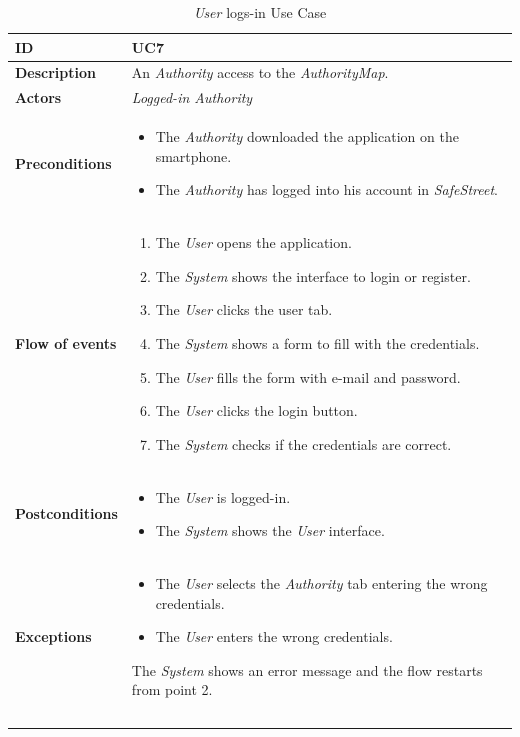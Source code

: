 \documentclass {article}
\begin{document}
	\begin{longtable}{| p{3 cm} | p{10.5 cm} |} 
			\hline
			{\bf ID} & UC7 \\
			\hline
			{\bf Description} & An {\it Authority} access to the {\it AuthorityMap}.\\
			\hline
			{\bf Actors} & {\it Logged-in Authority}\\
			\hline
			{\bf Preconditions} & 	
			\begin{itemize}
				\item The {\it Authority} downloaded the application on the smartphone.
				\item The {\it Authority} has logged into his account in {\it SafeStreet}.
			\end{itemize}
			\\
			\hline
			{\bf Flow of events} &	
			\begin{enumerate}
				\item The {\it User} opens the application.
				\item The {\it System} shows the interface to login or register.
				\item The {\it User} clicks the user tab.
				\item The {\it System} shows a form to fill with the credentials.
				\item The {\it User} fills the form with e-mail and password. 
				\item The {\it User} clicks the login button.
				\item The {\it System} checks if the credentials are correct. 
			\end{enumerate}
			\\
			\hline
			{\bf Postconditions} & 
			\begin{itemize}
				\item The {\it User} is logged-in.
				\item The {\it System} shows the {\it User} interface.
			\end{itemize}
			\\
			\hline
			{\bf Exceptions} & 	
			\begin{itemize}
				\item The {\it User} selects the {\it Authority} tab entering the wrong credentials. 
				\item The {\it User} enters the wrong credentials.
			\end{itemize}
			The {\it System} shows an error message and the flow restarts from point 2.
			\\ \\
			\hline
			\caption{{\it User} logs-in Use Case}
			\end{longtable}
			
\end{document}
